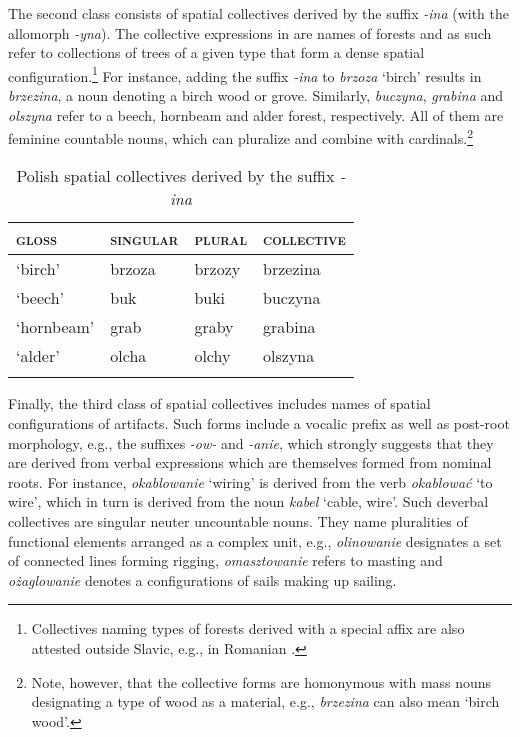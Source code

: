\documentclass[output=paper]{langscibook}
\begin{document}
The second class consists of spatial collectives derived by the suffix \textit{-ina} (with the allomorph \textit{-yna}). The collective expressions in  are names of forests and as such refer to collections of trees of a given type that form a dense spatial configuration.\footnote{Collectives naming types of forests derived with a special affix are also attested outside Slavic, e.g., in Romanian \citep{henderson2017swarms}.} For instance, adding the suffix \textit{-ina} to \textit{brzoza} `birch' results in \textit{brzezina}, a noun denoting a birch wood or grove. Similarly, \textit{buczyna}, \textit{grabina} and \textit{olszyna} refer to a beech, hornbeam and alder forest, respectively. All of them are feminine countable nouns, which can pluralize and combine with cardinals.\footnote{Note, however, that the collective forms are homonymous with mass nouns designating a type of wood as a material, e.g., \textit{brzezina} can also mean `birch wood'.} 

\begin{table}[h!]
\caption{Polish spatial collectives derived by the suffix \textit{-ina}} 
\label{wan:tab:brzezina}
 \begin{tabular}{llll} 
  \lsptoprule
          \textsc{gloss}  & \textsc{singular} & \textsc{plural} & \textsc{collective} \\ 
  \midrule
  `birch'  &   brzoza &    brzozy  &    brzezina \\
  `beech'  &   buk &   buki &    buczyna \\
  `hornbeam'  &   grab &   graby &    grabina \\
  `alder'  &   olcha &   olchy &    olszyna \\
  \lspbottomrule
 \end{tabular}
\end{table}

Finally, the third class of spatial collectives includes names of spatial configurations of artifacts.  Such forms include a vocalic prefix as well as post-root morphology, e.g., the suffixes \textit{-ow-} and \textit{-anie}, which strongly suggests that they are derived from verbal expressions which are themselves formed from nominal roots. For instance, \textit{okablowanie} `wiring' is derived from the verb \textit{okablować} `to wire', which in turn is derived from the noun \textit{kabel} `cable, wire'. Such deverbal collectives are singular neuter uncountable nouns. They name pluralities of functional elements arranged as a complex unit, e.g., \textit{olinowanie} designates a set of connected lines forming rigging, \textit{omasztowanie} refers to masting and \textit{ożaglowanie} denotes a configurations of sails making up sailing. 
\end{document}
